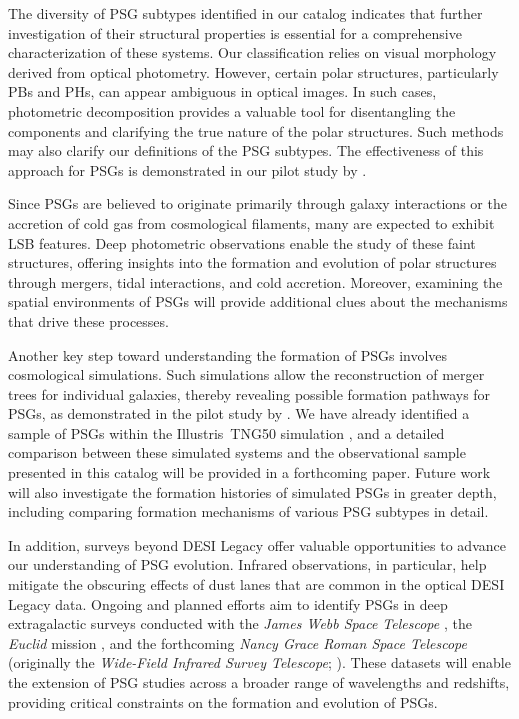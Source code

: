 \documentclass{aa}
\begin{document}
The diversity of PSG subtypes identified in our catalog indicates that further investigation of their structural properties is essential for a comprehensive characterization of these systems. Our classification relies on visual morphology derived from optical photometry. However, certain polar structures, particularly PBs and PHs, can appear ambiguous in optical images. In such cases, photometric decomposition provides a valuable tool for disentangling the components and clarifying the true nature of the polar structures. Such methods may also clarify our definitions of the PSG subtypes. The effectiveness of this approach for PSGs is demonstrated in our pilot study by \citet{2025A&A...698L..21B}.

Since PSGs are believed to originate primarily through galaxy interactions or the accretion of cold gas from cosmological filaments, many are expected to exhibit LSB features. Deep photometric observations enable the study of these faint structures, offering insights into the formation and evolution of polar structures through mergers, tidal interactions, and cold accretion. Moreover, examining the spatial environments of PSGs will provide additional clues about the mechanisms that drive these processes.

Another key step toward understanding the formation of PSGs involves cosmological simulations. Such simulations allow the reconstruction of merger trees for individual galaxies, thereby revealing possible formation pathways for PSGs, as demonstrated in the pilot study by \citet{smirnov2024}. We have already identified a sample of PSGs within the Illustris~TNG50 simulation \citep{2019MNRAS.490.3196P,2019MNRAS.490.3234N}, and a detailed comparison between these simulated systems and the observational sample presented in this catalog will be provided in a forthcoming paper. Future work will also investigate the formation histories of simulated PSGs in greater depth, including comparing formation mechanisms of various PSG subtypes in detail. 

In addition, surveys beyond DESI Legacy offer valuable opportunities to advance our understanding of PSG evolution. Infrared observations, in particular, help mitigate the obscuring effects of dust lanes that are common in the optical DESI Legacy data. Ongoing and planned efforts aim to identify PSGs in deep extragalactic surveys conducted with the \textit{James Webb Space Telescope} \citep{2023PASP..135f8001G}, the \textit{Euclid} mission \citep{2025A&A...697A...1E}, and the forthcoming \textit{Nancy Grace Roman Space Telescope} (originally the \textit{Wide-Field Infrared Survey Telescope}; \citealt{2015arXiv150303757S}). These datasets will enable the extension of PSG studies across a broader range of wavelengths and redshifts, providing critical constraints on the formation and evolution of PSGs.
\end{document}
